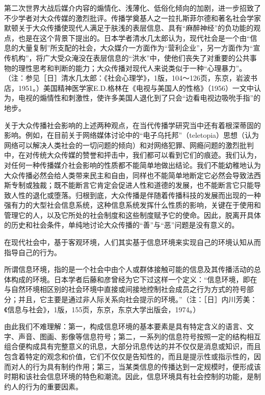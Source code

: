 \documentclass[UTF8,12pt]{ctexart}
\numberwithin{equation}{section} %
\numberwithin{figure}{section}
\numberwithin{table}{section}
\begin{document}
	第二次世界大战后媒介内容的煽情化、浅薄化、低俗化倾向的加剧，进一步招致了不少学者对大众传媒的激烈批评。传播学奠基人之一拉扎斯菲尔德和著名社会学家默顿关于大众传播使现代人满足于肤浅的表层信息、具有“麻醉神经”的负功能的观点，也是在这个背景下提出的。日本学者清水几太郎认为，现代社会是一个由“信息的大量复制”所支配的社会，大众媒介一方面作为“营利企业”，另一方面作为“宣传机构”，将广大受众淹没在表层信息的“洪水”中，使他们丧失了对重要的公共事物的理性思考和判断的能力；大众传播对现代人来说类似于一种“心理暴力”。（注：参见［日］清水几太郎：《社会心理学》，1版，104～126页，东京，岩波书店，1951。）美国精神医学家E.D.格林在《电视与美国人的性格》（1956）一文中认为，电视的煽情性和刺激性，使许多美国人退化到了只会“边看电视边吸吮手指”的地步。
	
	关于大众传播社会影响的上述两种观点，在当代传播学研究当中还有着根深蒂固的影响。例如，在目前关于网络媒体讨论中的“电子乌托邦”（teletopia）思想（认为网络可以解决人类社会的一切问题的倾向）和对网络犯罪、网瘾问题的激烈批判中，在对传统大众传媒的赞誉和抨击中，我们都可以看到它们的痕迹。我们认为，对任何一种传播媒介社会影响的性质都不能简单地做出结论。我们不能幼稚地认为大众传播必然会给人类带来民主和自由，同样也不能简单地断定它必然会导致法西斯专制或独裁；既不能断言它肯定会促进人性和道德的发展，也不能断言它只能导致人性的退化或堕落。归根到底，大众传播是伴随着传播科技的发展而出现的一种强有力的大型社会信息系统，这种信息系统发挥什么性质的影响，关键在于使用和管理它的人，以及它所处的社会制度和这些制度赋予它的使命。因此，脱离开具体的历史和社会条件，单纯地讨论大众传播的“善”与“恶”问题是没有意义的。
	
	
	在现代社会中，基于客观环境，人们其实基于信息环境来实现自己的环境认知从而指导自己的行为。
	
	所谓信息环境，指的是一个社会中由个人或群体接触可能的信息及其传播活动的总体构成的环境。日本学者后藤和彦曾经为它下过这样一个定义：“信息环境，即在与自然环境相区别的社会环境中直接或间接地控制社会成员之行为方式的符号部分；并且，它主要是通过非人际关系向社会提示的环境。”（注：［日］内川芳美：《信息与社会》，1版，155页，东京，东京大学出版会，1974。）
	
	由此我们不难理解：第一，构成信息环境的基本要素是具有特定含义的语言、文字、声音、图画、影像等信息符号；第二，一系列的信息符号按照一定的结构相互组合便构成具有完整意义的讯息，大部分讯息传达的并不仅仅是消息或知识，而且包含着特定的观念和价值，它们不仅仅是告知性的，而且是提示性或指示性的，因而对人的行为具有制约作用；第三，当某类信息的传播达到一定规模时，便形成该时期和该社会信息环境的特色和潮流。因此，信息环境具有社会控制的功能，是制约人的行为的重要因素。
	
\end{document}
